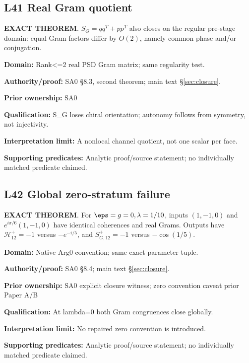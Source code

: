 \par\noindent\begin{minipage}{\linewidth}
\subsection*{L41 Real Gram quotient}
\textbf{EXACT THEOREM}. \(S_G=qq^T+pp^T\) also closes on the regular pre-stage domain: equal Gram factors differ by \(O(2)\), namely common phase and/or conjugation.\par
\textbf{Domain:} Rank<=2 real PSD Gram matrix; same regularity test.\par
\textbf{Authority/proof:} SA0 \S{}8.3, second theorem; main text \S\ref{sec:closure}.\par
\textbf{Prior ownership:} SA0\par
\textbf{Qualification:} S\_G loses chiral orientation; autonomy follows from symmetry, not injectivity.\par
\textbf{Interpretation limit:} A nonlocal channel quotient, not one scalar per face.\par
\textbf{Supporting predicates:} Analytic proof/source statement; no individually matched predicate claimed.\par
\end{minipage}\par\medskip
\par\noindent\begin{minipage}{\linewidth}
\subsection*{L42 Global zero-stratum failure}
\textbf{EXACT THEOREM}. For \(\eps=g=0,\lambda=1/10\), inputs \((1,-1,0)\) and \(e^{i\pi/6}(1,-1,0)\) have identical coherences and real Grams. Outputs have \(\mathcal H_{12}^+=-1\) versus \(-e^{-i/5}\), and \(S_{G,12}^+=-1\) versus \(-\cos(1/5)\).\par
\textbf{Domain:} Native Arg0 convention; same exact parameter tuple.\par
\textbf{Authority/proof:} SA0 \S{}8.4; main text \S\ref{sec:closure}.\par
\textbf{Prior ownership:} SA0 explicit closure witness; zero convention caveat prior Paper A/B\par
\textbf{Qualification:} At lambda=0 both Gram congruences close globally.\par
\textbf{Interpretation limit:} No repaired zero convention is introduced.\par
\textbf{Supporting predicates:} Analytic proof/source statement; no individually matched predicate claimed.\par
\end{minipage}\par\medskip
